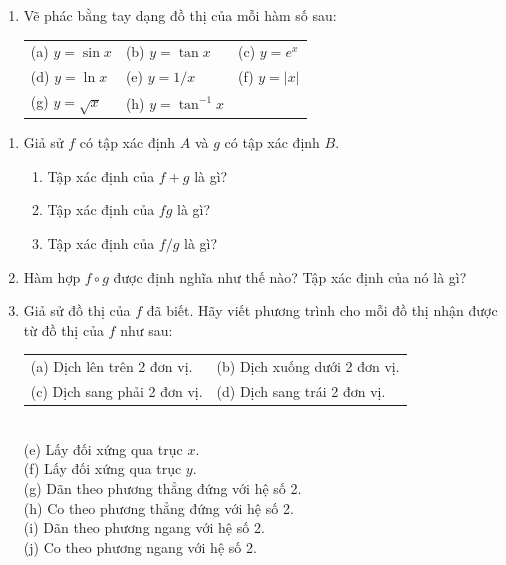\begin{minipage}[t]{0.485\textwidth}
\begin{enumerate}[label=\textbf{\arabic*.}, leftmargin=1.4em, itemsep=3.5pt, topsep=1pt, parsep=0pt]
    \item Vẽ phác bằng tay dạng đồ thị của mỗi hàm số sau:\\[2pt]
    \begin{tabular}{@{}lll@{}}
    \textsf{(a)} $y = \sin x$ & \textsf{(b)} $y = \tan x$ & \textsf{(c)} $y = e^x$ \\
    \textsf{(d)} $y = \ln x$ & \textsf{(e)} $y = 1/x$ & \textsf{(f)} $y = |x|$ \\
    \textsf{(g)} $y = \sqrt{x}$ & \textsf{(h)} $y = \tan^{-1} x$ &
    \end{tabular}
\end{enumerate}
\end{minipage}%
\hfill
\begin{minipage}[t]{0.485\textwidth}
\fontsize{8.5}{10.8}\selectfont
\begin{enumerate}[label=\textbf{\arabic*.}, leftmargin=1.4em, itemsep=3.5pt, topsep=1pt, parsep=0pt, start=9]
    \item Giả sử $f$ có tập xác định $A$ và $g$ có tập xác định $B$.
    \begin{enumerate}[label=\textsf{(\alph*)}, leftmargin=1.3em, itemsep=1.5pt, topsep=1pt]
        \item Tập xác định của $f + g$ là gì?
        \item Tập xác định của $fg$ là gì?
        \item Tập xác định của $f/g$ là gì?
    \end{enumerate}

    \item Hàm hợp $f \circ g$ được định nghĩa như thế nào? Tập xác định của nó là gì?

    \item Giả sử đồ thị của $f$ đã biết. Hãy viết phương trình cho mỗi đồ thị nhận được từ đồ thị của $f$ như sau:\\[2pt]
    \begin{tabular}{@{}ll@{}}
    \textsf{(a)} Dịch lên trên 2 đơn vị. & \textsf{(b)} Dịch xuống dưới 2 đơn vị. \\
    \textsf{(c)} Dịch sang phải 2 đơn vị. & \textsf{(d)} Dịch sang trái 2 đơn vị.
    \end{tabular}\\[1pt]
    \textsf{(e)} Lấy đối xứng qua trục $x$.\\[1pt]
    \textsf{(f)} Lấy đối xứng qua trục $y$.\\[1pt]
    \textsf{(g)} Dãn theo phương thẳng đứng với hệ số 2.\\[1pt]
    \textsf{(h)} Co theo phương thẳng đứng với hệ số 2.\\[1pt]
    \textsf{(i)} Dãn theo phương ngang với hệ số 2.\\[1pt]
    \textsf{(j)} Co theo phương ngang với hệ số 2.


\end{enumerate}
\end{minipage}
